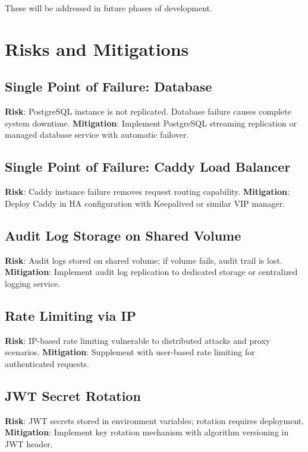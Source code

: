 \documentclass[12pt,oneside,a4paper]{article}
\begin{document}
These will be addressed in future phases of development.

\newpage

\section{Risks and Mitigations}

\subsection{Single Point of Failure: Database}
\textbf{Risk}: PostgreSQL instance is not replicated. Database failure causes complete system downtime.
\newline\textbf{Mitigation}: Implement PostgreSQL streaming replication or managed database service with automatic failover.

\subsection{Single Point of Failure: Caddy Load Balancer}
\textbf{Risk}: Caddy instance failure removes request routing capability.
\newline\textbf{Mitigation}: Deploy Caddy in HA configuration with Keepalived or similar VIP manager.

\subsection{Audit Log Storage on Shared Volume}
\textbf{Risk}: Audit logs stored on shared volume; if volume fails, audit trail is lost.
\newline\textbf{Mitigation}: Implement audit log replication to dedicated storage or centralized logging service.

\subsection{Rate Limiting via IP}
\textbf{Risk}: IP-based rate limiting vulnerable to distributed attacks and proxy scenarios.
\newline\textbf{Mitigation}: Supplement with user-based rate limiting for authenticated requests.

\subsection{JWT Secret Rotation}
\textbf{Risk}: JWT secrets stored in environment variables; rotation requires deployment.
\newline\textbf{Mitigation}: Implement key rotation mechanism with algorithm versioning in JWT header.
\end{document}
